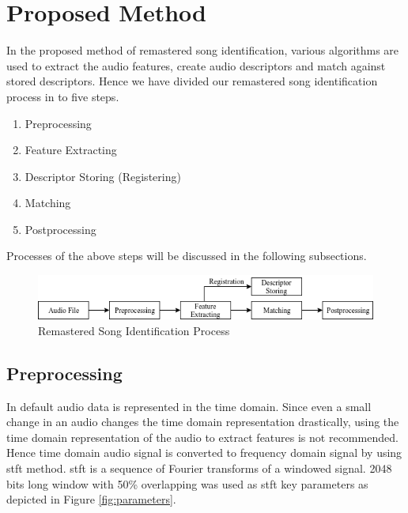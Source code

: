 \section{Proposed Method}


In the proposed method of remastered song identification, various algorithms are used to
extract the audio features, create audio descriptors and match against stored descriptors.
Hence we have divided our remastered song identification process in to five steps.

\begin{enumerate}
    \item Preprocessing
    \item Feature Extracting
    \item Descriptor Storing (Registering)
    \item Matching
    \item Postprocessing
  \end{enumerate}

Processes of the above steps will be discussed in the following subsections.

\begin{figure}[h]
    \centering
    \includegraphics[scale=0.4]{research_paper/graphics/pipeline.png}
    \caption{Remastered Song Identification Process}
    \label{fig:pipeline}
\end{figure}


\subsection{Preprocessing}

In default audio data is represented in the time domain. Since even a small change in an audio changes the time domain representation drastically,
using the time domain representation of the audio to extract features is not recommended. Hence time domain audio signal is converted to
frequency domain signal by using \gls{stft} method. \gls{stft} is a sequence of Fourier transforms of a windowed signal\cite{Kehtarnavaz2008}.
2048 bits long window with 50\% overlapping was used as \gls{stft} key parameters as depicted in Figure \ref{fig:parameters}.

